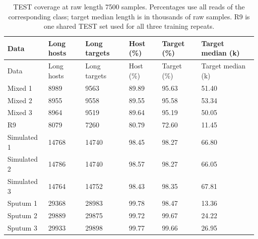 \begin{longtable}{llllll}
\caption{TEST coverage at raw length 7500 samples. Percentages use all reads of the corresponding class; target median length is in thousands of raw samples. R9 is one shared TEST set used for all three training repeats.}\label{tab:s_length_eligibility}\\
\toprule
Data & Long hosts & Long targets & Host (\%) & Target (\%) & Target median (k)\\\midrule\endfirsthead
\toprule
Data & Long hosts & Long targets & Host (\%) & Target (\%) & Target median (k)\\\midrule\endhead
\bottomrule\endfoot
Mixed 1 & 8989 & 9563 & 89.89 & 95.63 & 51.40\\
Mixed 2 & 8955 & 9558 & 89.55 & 95.58 & 53.34\\
Mixed 3 & 8964 & 9519 & 89.64 & 95.19 & 50.05\\
R9 & 8079 & 7260 & 80.79 & 72.60 & 11.45\\
Simulated 1 & 14768 & 14740 & 98.45 & 98.27 & 66.80\\
Simulated 2 & 14786 & 14740 & 98.57 & 98.27 & 66.05\\
Simulated 3 & 14764 & 14752 & 98.43 & 98.35 & 67.81\\
Sputum 1 & 29368 & 28983 & 99.78 & 98.47 & 13.36\\
Sputum 2 & 29889 & 29875 & 99.72 & 99.67 & 24.22\\
Sputum 3 & 29933 & 29898 & 99.77 & 99.66 & 26.95\\
\end{longtable}
